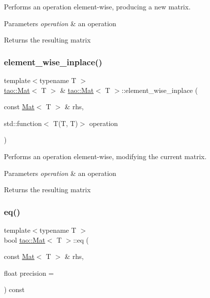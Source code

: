 Performs an operation element-\/wise, producing a new matrix. 


\begin{DoxyParams}{Parameters}
{\em operation} & an operation \\
\hline
\end{DoxyParams}
\begin{DoxyReturn}{Returns}
the resulting matrix 
\end{DoxyReturn}
\mbox{\label{classtao_1_1_mat_adf31d67ec117de70423499bfa81f124c}} 
\subsubsection{\texorpdfstring{element\_wise\_inplace()}{element\_wise\_inplace()}}
{\footnotesize\ttfamily template$<$typename T $>$ \\
\mbox{\hyperlink{classtao_1_1_mat}{tao\+::\+Mat}}$<$ T $>$ \& \mbox{\hyperlink{classtao_1_1_mat}{tao\+::\+Mat}}$<$ T $>$\+::element\+\_\+wise\+\_\+inplace (\begin{DoxyParamCaption}\item[{const \mbox{\hyperlink{classtao_1_1_mat}{Mat}}$<$ T $>$ \&}]{rhs,  }\item[{std\+::function$<$ T(T, T)$>$}]{operation }\end{DoxyParamCaption})}



Performs an operation element-\/wise, modifying the current matrix. 


\begin{DoxyParams}{Parameters}
{\em operation} & an operation \\
\hline
\end{DoxyParams}
\begin{DoxyReturn}{Returns}
the resulting matrix 
\end{DoxyReturn}
\mbox{\label{classtao_1_1_mat_aba6fa294c4b246f9750f6836a116c6db}} 
\subsubsection{\texorpdfstring{eq()}{eq()}}
{\footnotesize\ttfamily template$<$typename T $>$ \\
bool \mbox{\hyperlink{classtao_1_1_mat}{tao\+::\+Mat}}$<$ T $>$\+::eq (\begin{DoxyParamCaption}\item[{const \mbox{\hyperlink{classtao_1_1_mat}{Mat}}$<$ T $>$ \&}]{rhs,  }\item[{float}]{precision = {} }\end{DoxyParamCaption}) const}



